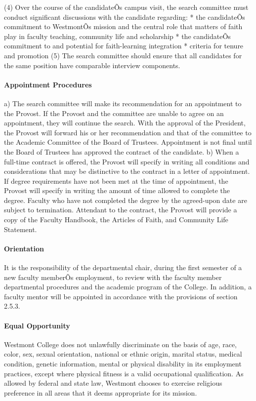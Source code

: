 \documentclass[letterpaper, 11pt]{article}
\begin{document}
				(4) Over the course of the candidateÕs campus visit, the search committee must conduct significant discussions with the candidate regarding:
				* the candidateÕs commitment to WestmontÕs mission and the central role that matters of faith play in faculty teaching, community life and scholarship
				* the candidateÕs commitment to and potential for faith-learning integration
				* criteria for tenure and promotion
				(5) The search committee should ensure that all candidates for the same position have comparable interview components.

			\paragraph{Appointment Procedures}

				a) The search committee will make its recommendation for an appointment to the Provost.  If the Provost and the committee are unable to agree on an appointment, they will continue the search.  With the approval of the President, the Provost will forward his or her recommendation and that of the committee to the Academic Committee of the Board of Trustees.  Appointment is not final until the Board of Trustees has approved the contract of the candidate.
				b) When a full-time contract is offered, the Provost will specify in writing all conditions and considerations that may be distinctive to the contract in a letter of appointment.  If degree requirements have not been met at the time of appointment, the Provost will specify in writing the amount of time allowed to complete the degree.  Faculty who have not completed the degree by the agreed-upon date are subject to termination.  Attendant to the contract, the Provost will provide a copy of the Faculty Handbook, the Articles of Faith, and Community Life Statement.
			\paragraph{Orientation}
				It is the responsibility of the departmental chair, during the first semester of a new faculty memberÕs employment, to review with the faculty member departmental procedures and the academic program of the College.  In addition, a faculty mentor will be appointed in accordance with the provisions of section 2.5.3.
			\paragraph{Equal Opportunity}
				Westmont College does not unlawfully discriminate on the basis of age, race, color, sex, sexual orientation, national or ethnic origin, marital status, medical condition, genetic information, mental or physical disability in its employment practices, except where physical fitness is a valid occupational qualification. As allowed by federal and state law, Westmont chooses to exercise religious preference in all areas that it deems appropriate for its mission.
\end{document}

